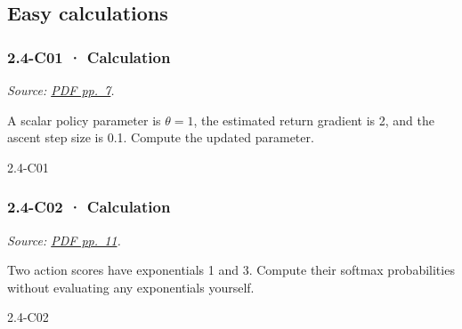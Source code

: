 \subsection{Easy calculations}\label{easy-calculations-6}

\noindent\begin{minipage}{\linewidth}

\subsubsection{2.4-C01 · Calculation}\label{c01-calculation-6}

\emph{Source:
\href{../Lecture\%20Slides/2.4.\%20Policy\%20Search.pdf\#page=7}{PDF
pp.~7}.}

A scalar policy parameter is \(\theta=1\), the estimated return gradient
is 2, and the ascent step size is 0.1. Compute the updated parameter.

\begin{solution}[26mm]{2.4-C01}

\end{solution}
\end{minipage}\par\medskip

\noindent\begin{minipage}{\linewidth}

\subsubsection{2.4-C02 · Calculation}\label{c02-calculation-6}

\emph{Source:
\href{../Lecture\%20Slides/2.4.\%20Policy\%20Search.pdf\#page=11}{PDF
pp.~11}.}

Two action scores have exponentials 1 and 3. Compute their softmax
probabilities without evaluating any exponentials yourself.

\begin{solution}[26mm]{2.4-C02}

\end{solution}
\end{minipage}\par\medskip

